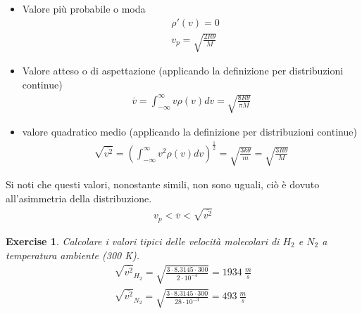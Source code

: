 \documentclass[10pt,a4paper]{article}
\newtheorem{exercise}{Exercise}
\begin{document}
\begin{itemize}
	\item Valore più probabile o moda
	\begin{align*} 
		&\rho'(v)  =  0\\
		&v_p = \sqrt{\frac{2R\theta}{M}}
	\end{align*} 
	\item Valore atteso o di aspettazione (applicando la definizione per distribuzioni continue)
	\begin{align*} 
		\overline{v} = \int_{-\infty}^{\infty}v \rho(v)dv = \sqrt{\frac{8R\theta}{\pi M}}
	\end{align*} 
	\item valore quadratico medio (applicando la definizione per distribuzioni continue)
	\begin{align*} 
			\sqrt{\overline{v^2}} = \left(\int_{-\infty}^{\infty}v^2 \rho(v)dv\right)^{\frac{1}{2}} = \sqrt{\frac{3k\theta}{m}}= \sqrt{\frac{3R\theta}{M}}
	\end{align*} 
\end{itemize}
Si noti che questi valori, nonostante simili, non sono uguali, ciò è dovuto all'asimmetria della distribuzione. 
\begin{align*} 
	v_p<\overline{v}<\sqrt{\overline{v^2}}
\end{align*} 
\begin{exercise}
	Calcolare i valori tipici delle velocità molecolari di $H_2$ e $N_2$ a temperatura ambiente (300 K).
	\begin{align*} 
		\sqrt{\overline{v^2}}_{H_2}=\sqrt{\frac{3\cdot 8.3145\cdot 300}{2\cdot 10^{-3}}}=1934\ \frac{m}{s}\\
			\sqrt{\overline{v^2}}_{N_2}=\sqrt{\frac{3\cdot 8.3145\cdot 300}{28\cdot 10^{-3}}}=493\ \frac{m}{s}\\
	\end{align*} 
\end{exercise}
\end{document}
